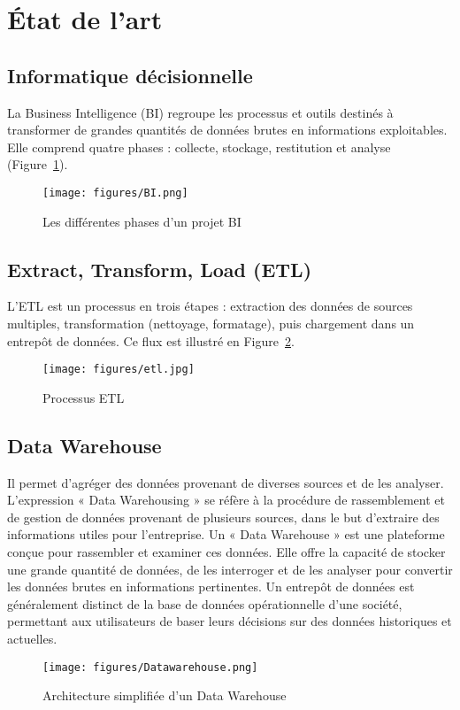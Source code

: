 \documentclass[12pt,a4paper]{report}
\begin{document}
\section{État de l’art}
\subsection{Informatique décisionnelle}
La Business Intelligence (BI) regroupe les processus et outils destinés à transformer de grandes quantités de données brutes en informations exploitables. Elle comprend quatre phases : collecte, stockage, restitution et analyse (Figure~\ref{fig:bi_phases}).  
\begin{figure}[H]
  \centering
  \texttt{[image: figures/BI.png]}
  \caption{Les différentes phases d’un projet BI}
  \label{fig:bi_phases}
\end{figure}


\subsection{Extract, Transform, Load (ETL)}
L’ETL est un processus en trois étapes : extraction des données de sources multiples, transformation (nettoyage, formatage), puis chargement dans un entrepôt de données. Ce flux est illustré en Figure~\ref{fig:etl_process}.  
\begin{figure}[H]
  \centering
  \texttt{[image: figures/etl.jpg]}
  \caption{Processus ETL}
  \label{fig:etl_process}
\end{figure}


\subsection{Data Warehouse}
Il permet d’agréger des données provenant de diverses sources et de les analyser. L’expression « Data Warehousing » se réfère à la procédure de rassemblement et de gestion de données provenant de plusieurs sources, dans le but d’extraire des informations utiles pour l’entreprise. Un « Data Warehouse » est une plateforme conçue pour rassembler et examiner ces données. Elle offre la capacité de stocker une grande quantité de données, de les interroger et de les analyser pour convertir les données brutes en informations pertinentes. Un entrepôt de données est généralement distinct de la base de données opérationnelle d’une société, permettant aux utilisateurs de baser leurs décisions sur des données historiques et actuelles.  
\begin{figure}[H]
  \centering
  \texttt{[image: figures/Datawarehouse.png]}
  \caption{Architecture simplifiée d’un Data Warehouse}
  \label{fig:data_warehouse}
\end{figure}
\end{document}

